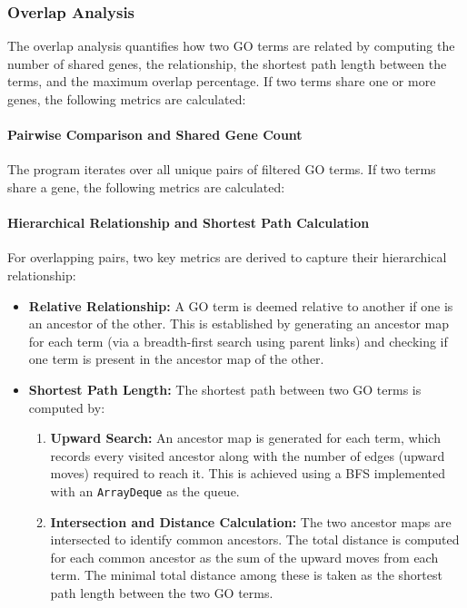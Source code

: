 \documentclass{article}
\begin{document}
    \subsubsection{Overlap Analysis}\label{subsubsec:overlap-analysis}
    The overlap analysis quantifies how two GO terms are related by computing the number of shared genes, the relationship, the shortest path length between the terms, and the maximum overlap percentage. If two terms share one or more genes, the following metrics are calculated:

    \paragraph{Pairwise Comparison and Shared Gene Count}
    The program iterates over all unique pairs of filtered GO terms. If two terms share a gene, the following metrics are calculated:

    \paragraph{Hierarchical Relationship and Shortest Path Calculation}
    For overlapping pairs, two key metrics are derived to capture their hierarchical relationship:
    \begin{itemize}
        \item \textbf{Relative Relationship:}
        A GO term is deemed relative to another if one is an ancestor of the other. This is established by generating an ancestor map for each term (via a breadth-first search using parent links) and checking if one term is present in the ancestor map of the other.
        \item \textbf{Shortest Path Length:}
        The shortest path between two GO terms is computed by:
        \begin{enumerate}
            \item \textbf{Upward Search:} An ancestor map is generated for each term, which records every visited ancestor along with the number of edges (upward moves) required to reach it. This is achieved using a BFS implemented with an \texttt{ArrayDeque} as the queue.
            \item \textbf{Intersection and Distance Calculation:} The two ancestor maps are intersected to identify common ancestors. The total distance is computed for each common ancestor as the sum of the upward moves from each term. The minimal total distance among these is taken as the shortest path length between the two GO terms.
        \end{enumerate}
    \end{itemize}
\end{document}
